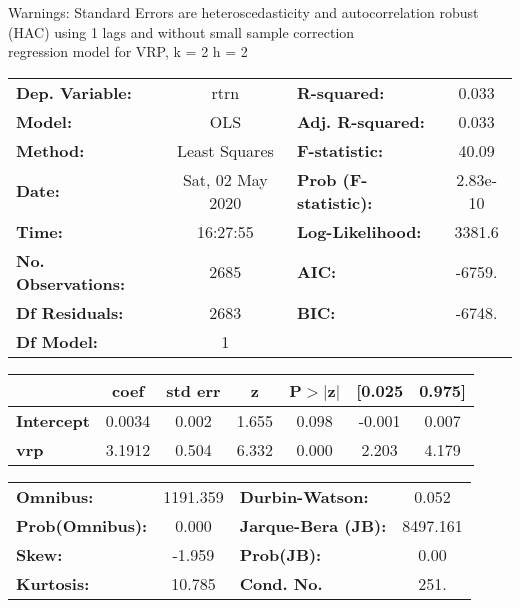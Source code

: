 Warnings: \newline
 [1] Standard Errors are heteroscedasticity and autocorrelation robust (HAC) using 1 lags and without small sample correction\\ 

regression model for VRP, k = 2 h = 2\begin{center}
\begin{tabular}{lclc}
\toprule
\textbf{Dep. Variable:}    &       rtrn       & \textbf{  R-squared:         } &     0.033   \\
\textbf{Model:}            &       OLS        & \textbf{  Adj. R-squared:    } &     0.033   \\
\textbf{Method:}           &  Least Squares   & \textbf{  F-statistic:       } &     40.09   \\
\textbf{Date:}             & Sat, 02 May 2020 & \textbf{  Prob (F-statistic):} &  2.83e-10   \\
\textbf{Time:}             &     16:27:55     & \textbf{  Log-Likelihood:    } &    3381.6   \\
\textbf{No. Observations:} &        2685      & \textbf{  AIC:               } &    -6759.   \\
\textbf{Df Residuals:}     &        2683      & \textbf{  BIC:               } &    -6748.   \\
\textbf{Df Model:}         &           1      & \textbf{                     } &             \\
\bottomrule
\end{tabular}
\begin{tabular}{lcccccc}
                   & \textbf{coef} & \textbf{std err} & \textbf{z} & \textbf{P$> |$z$|$} & \textbf{[0.025} & \textbf{0.975]}  \\
\midrule
\textbf{Intercept} &       0.0034  &        0.002     &     1.655  &         0.098        &       -0.001    &        0.007     \\
\textbf{vrp}       &       3.1912  &        0.504     &     6.332  &         0.000        &        2.203    &        4.179     \\
\bottomrule
\end{tabular}
\begin{tabular}{lclc}
\textbf{Omnibus:}       & 1191.359 & \textbf{  Durbin-Watson:     } &    0.052  \\
\textbf{Prob(Omnibus):} &   0.000  & \textbf{  Jarque-Bera (JB):  } & 8497.161  \\
\textbf{Skew:}          &  -1.959  & \textbf{  Prob(JB):          } &     0.00  \\
\textbf{Kurtosis:}      &  10.785  & \textbf{  Cond. No.          } &     251.  \\
\bottomrule
\end{tabular}
\end{center}

